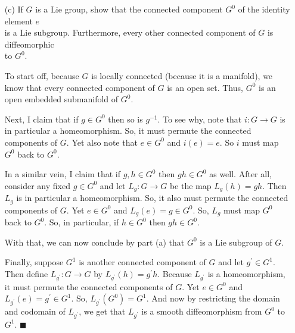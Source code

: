 \documentclass{book}
\newcommand{\HexOne}{%
   \color{Purple}%
   \fontsize{12}{13}\selectfont%
}
\newenvironment{myIndent}{%
   \begin{adjustwidth}{2.5em}{0em}%
}{%
   \end{adjustwidth}%
}
\newcommand{\retTwo}{\hfill\bigbreak}
\begin{document}
\begin{enumerate}
\begin{myIndent}
		Furthermore, note that $\mathbb{R}$ is a Lie group under addition. Plus, $\gamma: \mathbb{R} \to \mathbb{T}$ is a group homomorphism. Thus, $H$ is automatically a subgroup of $\mathbb{T}$. And by definition we have that $\gamma$ is a smooth diffeomorphism from $\mathbb{R}$ to $H$.\retTwo

		It follows that multiplication and inversion are continuous with respect to the topology on $H$ because addition and negation is smooth with respect to the topology on $\mathbb{R}$.\retTwo
	\end{myIndent}

	\item[(c)] If $G$ is a Lie group, show that the connected component $G^0$ of the identity element $e$\\ is a Lie subgroup. Furthermore, every other connected component of $G$ is diffeomorphic\\ to $G^0$.
	\begin{myIndent}\HexOne
		To start off, because $G$ is locally connected (because it is a manifold), we know that every connected component of $G$ is an open set. Thus, $G^0$ is an open embedded submanifold of $G^0$.\retTwo

		Next, I claim that if $g \in G^0$ then so is $g^{-1}$. To see why, note that $i: G \to G$ is in particular a homeomorphism. So, it must permute the connected components of $G$. Yet also note that $e \in G^0$ and $i(e) = e$. So $i$ must map $G^0$ back to $G^0$.\newpage

		In a similar vein, I claim that if $g, h \in G^0$ then $gh \in G^0$ as well. After all, consider any fixed $g \in G^0$ and let $L_g: G \to G$ be the map $L_g(h) = gh$. Then $L_g$ is in particular a homeomorphism. So, it also must permute the connected components of $G$. Yet $e \in G^0$ and $L_g(e) = g \in G^0$. So, $L_g$ must map $G^0$ back to $G^0$. So, in particular, if $h \in G^0$ then $gh \in G^0$.\retTwo

		With that, we can now conclude by part (a) that $G^0$ is a Lie subgroup of $G$.\retTwo

		Finally, suppose $G^1$ is another connected component of $G$ and let $g^\prime \in G^1$. Then define $L_{g^\prime}: G \to G$ by $L_{g^\prime}(h) = g^\prime h$. Because $L_{g^\prime}$ is a homeomorphism, it must permute the connected components of $G$. Yet $e \in G^0$ and $L_{g^\prime}(e) = g^\prime \in G^1$. So, $L_{g^\prime}(G^0) = G^1$. And now by restricting the domain and codomain of $L_{g^\prime}$, we get that $L_{g^\prime}$ is a smooth diffeomorphism from $G^0$ to $G^1$. $\blacksquare$\retTwo
	\end{myIndent}
\end{enumerate}
\end{document}
